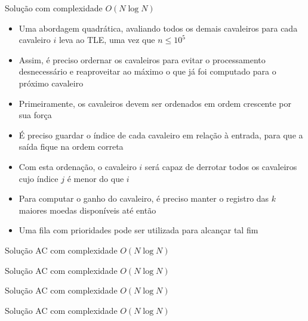 \begin{frame}[fragile]{Solução com complexidade $O(N\log N)$}

    \begin{itemize}
        \item Uma abordagem quadrática, avaliando todos os demais cavaleiros para cada
            cavaleiro $i$ leva ao TLE, uma vez que $n\leq 10^5$

        \item Assim, é preciso ordernar os cavaleiros para evitar o processamento 
            desnecessário e reaproveitar ao máximo o que já foi computado para o próximo
            cavaleiro

        \item Primeiramente, os cavaleiros devem ser ordenados em ordem crescente por sua força

        \item É preciso guardar o índice de cada cavaleiro em relação à entrada, para que a 
            saída fique na ordem correta

        \item Com esta ordenação, o cavaleiro $i$ será capaz de derrotar todos os cavaleiros
            cujo índice $j$ é menor do que $i$

        \item Para computar o ganho do cavaleiro, é preciso manter o registro das $k$ maiores
            moedas disponíveis até então

        \item Uma fila com prioridades pode ser utilizada para alcançar tal fim
   \end{itemize}

\end{frame}

\begin{frame}[fragile]{Solução AC com complexidade $O(N\log N)$}
\end{frame}

\begin{frame}[fragile]{Solução AC com complexidade $O(N\log N)$}
\end{frame}

\begin{frame}[fragile]{Solução AC com complexidade $O(N\log N)$}
\end{frame}

\begin{frame}[fragile]{Solução AC com complexidade $O(N\log N)$}
\end{frame}
